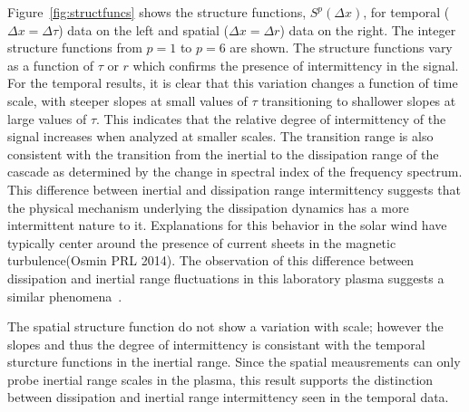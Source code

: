 \documentclass[aps,prl,amsmath,amssymb,reprint,superscriptaddress]{revtex4-1} %
\begin{document}
Figure~\ref{fig:structfuncs} shows the structure functions, $S^{p}(\Delta x)$, for temporal ($\Delta x = \Delta \tau$) data on the left and spatial ($\Delta x = \Delta r$) data on the right. The integer structure functions from $p=1$ to $p=6$ are shown. The structure functions vary as a function of $\tau$ or $r$ which confirms the presence of intermittency in the signal. For the temporal results, it is clear that this variation changes a function of time scale, with steeper slopes at small values of $\tau$ transitioning to shallower slopes at large values of $\tau$. This indicates that the relative degree of intermittency of the signal increases when analyzed at smaller scales. The transition range is also consistent with the transition from the inertial to the dissipation range of the cascade as determined by the change in spectral index of the frequency spectrum. This difference between inertial and dissipation range intermittency suggests that the physical mechanism underlying the dissipation dynamics has a more intermittent nature to it. Explanations for this behavior in the solar wind have typically center around the presence of current sheets in the magnetic turbulence(Osmin PRL 2014). The observation of this difference between dissipation and inertial range fluctuations in this laboratory plasma suggests a similar phenomena~\cite{schaffner2014b}. 

The spatial structure function do not show a variation with scale; however the slopes and thus the degree of intermittency is consistant with the temporal sturcture functions in the inertial range. Since the spatial meausrements can only probe inertial range scales in the plasma, this result supports the distinction between dissipation and inertial range intermittency seen in the temporal data.
\end{document}

